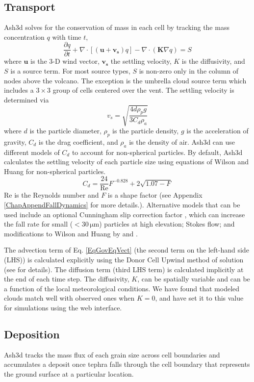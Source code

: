 \subsection{Transport}\label{ChapIntroSecTrans}
Ash3d solves for the conservation of mass in each cell by tracking the mass
concentration $q$ with time $t$,
\begin{equation}\label{EqGovEqVect}
 \frac{\partial q}{\partial t} +
   \nabla \cdot \left[ \left(\mathbf{u} + \mathbf{v_s} \right) q \right]
 - \nabla \cdot \left( \mathbf{K} \nabla q\right) = S
\end{equation}
where $\mathbf{u}$ is the 3-D wind vector,
$\mathbf{v_s}$ the settling velocity, $K$ is the
diffusivity, and $S$ is a source term.  For most source types, $S$
is non-zero only in the column of nodes above the volcano.  The
exception is the umbrella cloud source term which includes a
$3 \times 3$ group of cells centered over the vent.
The settling velocity is determined via \cite[p.182]{Bird60}
\begin{equation}
v_s=\sqrt{\frac{4d\rho_p g}{3C_d\rho_a}}\label{EqFallVel}
\end{equation}
where $d$ is the particle diameter, $\rho_p$ is the particle density, $g$ is
the acceleration of gravity, $C_d$ is the drag coefficient, and $\rho_a$
is the density of air.
Ash3d can use different models of $C_d$ to account for non-spherical particles.
By default, Ash3d calculates the settling
velocity of each particle size using equations of Wilson and Huang \cite{Wilson79}
for non-spherical particles.
\begin{equation}
C_d = \frac{24}{\mathrm{Re}}F^{-0.828}+2 \sqrt{1.07-F}\label{EqDragWH}
\end{equation}
$\mathrm{Re}$ is the Reynolds number and $F$ is a shape factor (see
Appendix \ref{ChapAppendFallDynamics} for more details.).
Alternative models that can be used include an
optional Cunningham slip correction factor \cite[p.407]{Seinfeld06},
which can increase the fall rate for small ($<30 \,\mathrm{\mu m}$)
particles at high elevation;
Stokes flow; and modifications to Wilson and Huang by \cite{Ganser93} and
\cite{Pfeiffer05}.

The advection term of Eq. \ref{EqGovEqVect} (the second term on the left-hand side
(LHS)) is calculated explicitly using the Donor Cell Upwind method of
solution (see \cite{Schwaiger12} for details). The diffusion term (third
LHS term) is calculated implicitly at the end of each time step. The diffusivity,
$K$, can be spatially variable and can be a function of the local meteorological
conditions. We have found that modeled clouds match well with observed ones
when $K=0$, and have set it to this value for simulations using the web interface.

\subsection{Deposition}\label{ChapIntroSecDepo}
Ash3d tracks the mass flux of each grain size across cell boundaries and
accumulates a deposit once tephra falls through the cell boundary that
represents the ground surface at a particular location.

